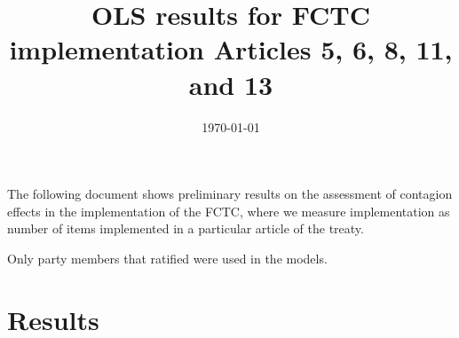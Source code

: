 \documentclass[10pt]{article}
\title{OLS results for FCTC implementation Articles 5, 6, 8, 11, and 13}
\date{\today}
\begin{document}
\maketitle
\tableofcontents

The following document shows preliminary results on the assessment of contagion
effects in the implementation of the FCTC, where we measure implementation as
number of items implemented in a particular article of the treaty.

Only party members that ratified were used in the models.


\clearpage\section{Results}














\end{document}
